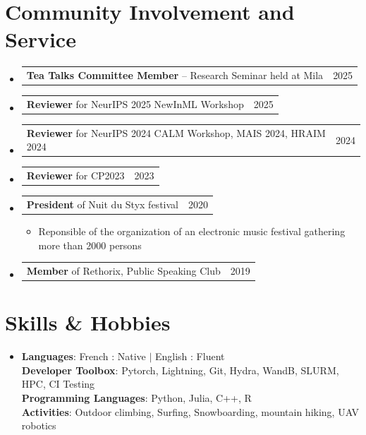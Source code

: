 \documentclass[letterpaper,11pt]{article}
\makeatletter
\newcommand{\resumeItem}[1]{
  \item\small{
    {#1 \vspace{-2pt}}
  }
}
\newcommand{\resumeProjectHeading}[2]{
    \item
    \begin{tabular*}{0.97\textwidth}{l@{\extracolsep{\fill}}r}
      \small#1 & #2 \\
    \end{tabular*}\vspace{-7pt}
}
\newcommand{\resumeSubHeadingListStart}{\begin{itemize}[leftmargin=0.15in, label={}]}
\newcommand{\resumeSubHeadingListEnd}{\end{itemize}}
\newcommand{\resumeItemListStart}{\begin{itemize}}
\newcommand{\resumeItemListEnd}{\end{itemize}\vspace{-5pt}}
\makeatother
\begin{document}
\section{Community Involvement and Service}
\resumeSubHeadingListStart
  \resumeProjectHeading
    {\textbf{Tea Talks Committee Member }– Research Seminar held at Mila}{2025}
  \resumeProjectHeading
    {\textbf{Reviewer} for NeurIPS 2025 NewInML Workshop}{2025}
  \resumeProjectHeading
    {\textbf{Reviewer} for NeurIPS 2024 CALM Workshop, MAIS 2024, HRAIM 2024}{2024}
  \resumeProjectHeading
    {\textbf{Reviewer} for CP2023}{2023}
  \resumeProjectHeading
    {\textbf{President} of Nuit du Styx festival}{2020}
    \resumeItemListStart
      \resumeItem{Reponsible of the organization of an electronic music festival gathering more than 2000 persons}
    \resumeItemListEnd
  \resumeProjectHeading
    {\textbf{Member} of Rethorix, Public Speaking Club }{2019}
\resumeSubHeadingListEnd
\section{Skills \& Hobbies}
 \begin{itemize}[leftmargin=0.15in, label={}]
    \item{
    \textbf{Languages}{: French : Native $|$ English : Fluent }} \\
     \textbf{Developer Toolbox}{: Pytorch, Lightning, Git, Hydra, WandB, SLURM, HPC, CI Testing} \\
     \textbf{Programming Languages}{: Python, Julia, C++, R} \\
    \vspace{10pt}
     \textbf{Activities}{: Outdoor climbing, Surfing, Snowboarding, mountain hiking, UAV robotics }
 \end{itemize}
\end{document}
